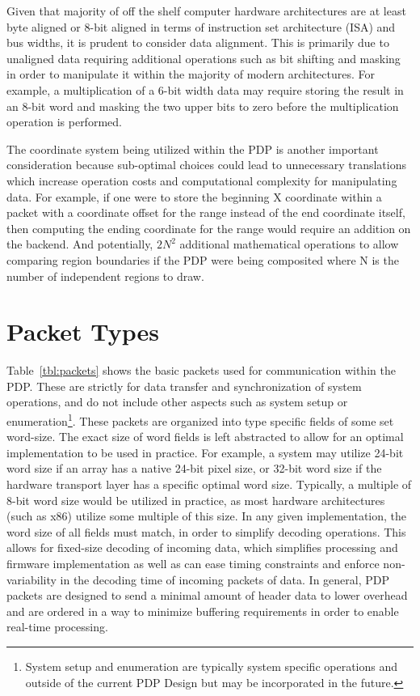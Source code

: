    Given that majority of off the shelf computer hardware architectures are at least byte aligned or 8-bit aligned in terms of instruction set architecture (ISA) and bus widths, it is prudent to consider data alignment. This is primarily due to unaligned data requiring additional operations such as bit shifting and masking in order to manipulate it within the majority of modern architectures. For example, a multiplication of a 6-bit width data may require storing the result in an 8-bit word and masking the two upper bits to zero before the multiplication operation is performed.

    The coordinate system being utilized within the PDP is another important consideration because sub-optimal choices could lead to unnecessary translations which increase operation costs and computational complexity for manipulating data. For example, if one were to store the beginning X coordinate within a packet with a coordinate offset for the range instead of the end coordinate itself, then computing the ending coordinate for the range would require an addition on the backend. And potentially, $2N^2$ additional mathematical operations to allow comparing region boundaries if the PDP were being composited where N is the number of independent regions to draw.

\section{Packet Types}
    \label{sec:packet_types}
    Table~\ref{tbl:packets} shows the basic packets used for communication within the PDP. These are strictly for data transfer and synchronization of system operations, and do not include other aspects such as system setup or enumeration\footnote{System setup and enumeration are typically system specific operations and outside of the current PDP Design but may be incorporated in the future.}. These packets are organized into type specific fields of some set word-size. The exact size of word fields is left abstracted to allow for an optimal implementation to be used in practice. For example, a system may utilize 24-bit word size if an array has a native 24-bit pixel size, or 32-bit word size if the hardware transport layer has a specific optimal word size. Typically, a multiple of 8-bit word size would be utilized in practice, as most hardware architectures (such as x86) utilize some multiple of this size\cite{HennessyEtAl2012}. In any given implementation, the word size of all fields must match, in order to simplify decoding operations. This allows for fixed-size decoding of incoming data, which simplifies processing and firmware implementation as well as can ease timing constraints and enforce non-variability in the decoding time of incoming packets of data. In general, PDP packets are designed to send a minimal amount of header data to lower overhead and are ordered in a way to minimize buffering requirements in order to enable real-time processing.


